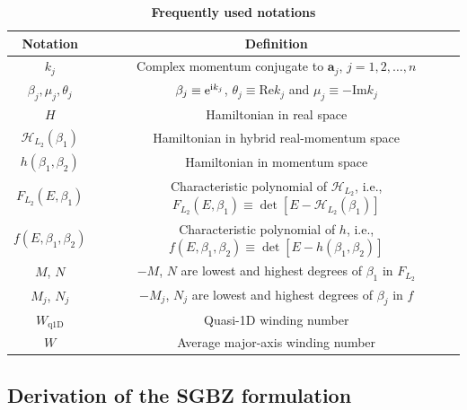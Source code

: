 \documentclass[pdflatex,sn-nature, iicol]{sn-jnl}%
\theoremstyle{thmstyleone}%
\theoremstyle{thmstyletwo}%
\theoremstyle{thmstylethree}%
\begin{document}
\begin{table}
\centering

\caption{\textbf{Frequently used notations}}
\label{tab:notation}

\begin{tabular}{|c|c|}
\hline 
Notation  & Definition\tabularnewline
\hline 
\hline 
$k_{j}$  & Complex momentum conjugate to $\mathbf{a}_{j}$, $j=1,2,\dots,n$\tabularnewline
\hline 
$\beta_{j},\mu_{j},\theta_{j}$  & $\beta_{j}\equiv\mathrm{e}^{\mathrm{i} k_{j}}$, $\theta_{j}\equiv\text{Re}k_{j}$
and $\mu_{j}\equiv-\text{Im}k_{j}$\tabularnewline
\hline 
$H$  & Hamiltonian in real space \tabularnewline
\hline 
$\mathcal{H}_{L_{2}}(\beta_{1})$  & Hamiltonian in hybrid real-momentum space\tabularnewline
\hline 
$h(\beta_{1},\beta_{2})$  & Hamiltonian in momentum space\tabularnewline
\hline 
$F_{L_{2}}(E,\beta_{1})$  & Characteristic polynomial of $\mathcal{H}_{L_{2}}$, i.e., $F_{L_{2}}(E,\beta_{1})\equiv\det\left[E-\mathcal{H}_{L_{2}}(\beta_{1})\right]$\tabularnewline
\hline 
$f(E,\beta_{1},\beta_{2})$  & Characteristic polynomial of $h$, i.e., $f(E,\beta_{1},\beta_{2})\equiv\det\left[E-h(\beta_{1},\beta_{2})\right]$\tabularnewline
\hline 
$M$, $N$  & $-M$, $N$ are lowest and highest degrees of $\beta_{1}$ in $F_{L_{2}}$\tabularnewline
\hline 
$M_{j}$, $N_{j}$  & $-M_{j}$, $N_{j}$ are lowest and highest degrees of $\beta_{j}$
in $f$\tabularnewline
\hline 
$W_{\text{q1D}}$  & Quasi-1D winding number\tabularnewline
\hline 
$W$  & Average major-axis winding number \tabularnewline
\hline 
\end{tabular}
\end{table}


\subsection{Derivation of the SGBZ formulation}

\label{subsec:derivation-SGBZ}
\end{document}
